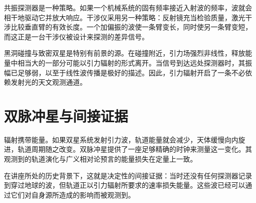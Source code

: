 共振探测器是一种策略。如果一个机械系统的固有频率接近入射波的频率，波就会相干地驱动它并放大响应。干涉仪采用另一种策略：反射镜充当检验质量，激光干涉比较垂直臂的有效长度。一个加偏振的波使一条臂变长，同时使另一条臂变短，而这正是一台干涉仪被设计来探测的差异信号。

\begin{classroomqa}
\end{classroomqa}

\begin{classroomqa}
\end{classroomqa}

\begin{classroomqa}
\end{classroomqa}

黑洞碰撞与致密双星是特别有前景的源。在碰撞附近，引力场强烈非线性，释放能量中相当大的一部分可能以引力辐射的形式离开。当信号到达远处探测器时，其振幅已足够弱，以至于线性波传播是极好的描述。因此，引力辐射开启了一条不必依赖发射光的天文观测通道。

\section{双脉冲星与间接证据}

辐射携带能量。如果双星系统发射引力波，轨道能量就会减少，天体缓慢向内旋进，轨道周期随之改变。双脉冲星提供了一座足够精确的时钟来测量这一变化。其观测到的轨道演化与广义相对论预言的能量损失在定量上一致。

在讲座所处的历史背景下，这就是决定性的间接证据：当时还没有任何探测器记录到穿过地球的波，但轨道正以引力辐射所要求的速率损失能量。这些波已经可以通过它们对自身源所造成的影响而被观测到。

